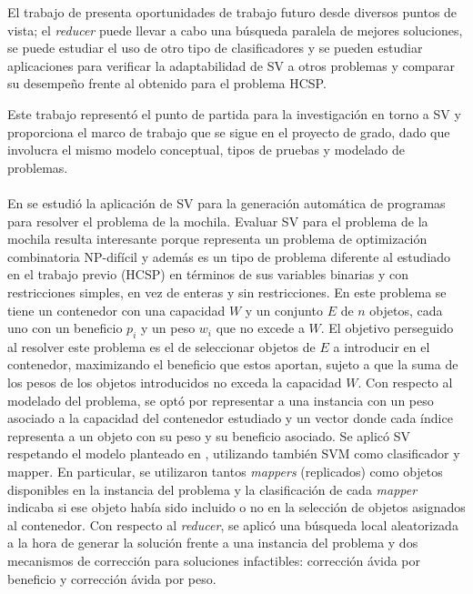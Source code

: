 El trabajo de \citet{savant-original} presenta oportunidades de trabajo futuro desde diversos puntos de vista; el \textit{reducer} puede llevar a cabo una búsqueda paralela de mejores soluciones, se puede estudiar el uso de otro tipo de clasificadores y se pueden estudiar aplicaciones para verificar la adaptabilidad de SV a otros problemas y comparar su desempeño frente al obtenido para el problema HCSP. 

Este trabajo representó el punto de partida para la investigación en torno a SV y proporciona el marco de trabajo que se sigue en el proyecto de grado, dado que involucra el mismo modelo conceptual, tipos de pruebas y modelado de problemas.

\paragraph{}En \citet{savant-bag} se estudió la aplicación de SV para la generación automática de programas para resolver el problema de la mochila.
Evaluar SV para el problema de la mochila resulta interesante porque representa un problema de optimización combinatoria NP-difícil y además es un tipo de problema diferente al estudiado en el trabajo previo (HCSP) en términos de sus variables binarias y con restricciones simples, en vez de enteras y sin restricciones.
En este problema se tiene un contenedor con una capacidad $W$ y un conjunto $E$ de $n$ objetos, cada uno con un beneficio $p_i$ y un peso $w_i$ que no excede a $W$.
El objetivo perseguido al resolver este problema es el de seleccionar objetos de $E$ a introducir en el contenedor, maximizando el beneficio que estos aportan, sujeto a que la suma de los pesos de los objetos introducidos no exceda la capacidad $W$.
Con respecto al modelado del problema, se optó por representar a una instancia con un peso asociado a la capacidad del contenedor estudiado y un vector donde cada índice representa a un objeto con su peso y su beneficio asociado.
Se aplicó SV respetando el modelo planteado en \citet{savant-original}, utilizando también SVM como clasificador y mapper.
En particular, se utilizaron tantos \textit{mappers} (replicados) como objetos disponibles en la instancia del problema y la clasificación de cada \textit{mapper} indicaba si ese objeto había sido incluido o no en la selección de objetos asignados al contenedor.
Con respecto al \textit{reducer}, se aplicó una búsqueda local aleatorizada a la hora de generar la solución frente a una instancia del problema y dos mecanismos de corrección para soluciones infactibles: corrección ávida por beneficio y corrección ávida por peso.
